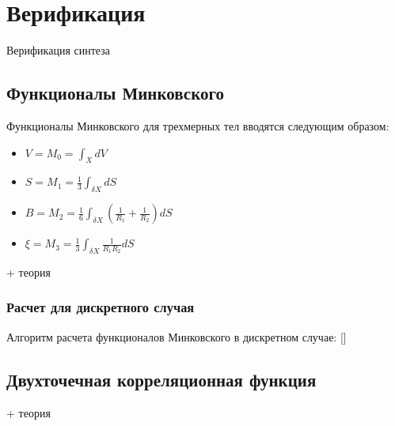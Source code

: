 \clearpage
\section{Верификация}

	Верификация синтеза
	
	\subsection{Функционалы Минковского}
		Функционалы Минковского для трехмерных тел вводятся следующим образом:
		\begin{itemize}
			\item $ \displaystyle V = M_0 = \int_{X} dV $
			\item $ \displaystyle S = M_1 = \frac{1}{3} \int_{\delta X} dS $
			\item $ \displaystyle B = M_2 = \frac{1}{6} \int_{\delta X} \left ( \frac{1}{R_1} + \frac{1}{R_2} \right ) dS$
			\item $\displaystyle \xi = M_3 = \frac{1}{3} \int_{\delta X} \frac{1}{R_1 R_2} dS $
		\end{itemize}
	
		+ теория
	
		\subsubsection{Расчет для дискретного случая}
			Алгоритм расчета функционалов Минковского в дискретном случае: []
	
	\subsection{Двухточечная корреляционная функция}
		
		+ теория
		